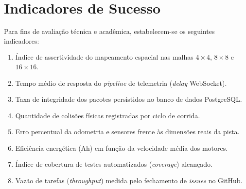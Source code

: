 \section{Indicadores de Sucesso}
Para fins de avaliação técnica e acadêmica, estabelecem-se os seguintes indicadores:
\begin{enumerate}
    \item Índice de assertividade do mapeamento espacial nas malhas $4\times4$, $8\times8$ e $16\times16$.
    \item Tempo médio de resposta do \textit{pipeline} de telemetria (\textit{delay} WebSocket).
    \item Taxa de integridade dos pacotes persistidos no banco de dados PostgreSQL.
    \item Quantidade de colisões físicas registradas por ciclo de corrida.
    \item Erro percentual da odometria e sensores frente às dimensões reais da pista.
    \item Eficiência energética (Ah) em função da velocidade média dos motores.
    \item Índice de cobertura de testes automatizados (\textit{coverage}) alcançado.
    \item Vazão de tarefas (\textit{throughput}) medida pelo fechamento de \textit{issues} no GitHub.
\end{enumerate}